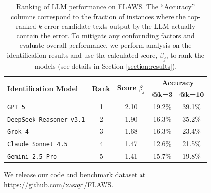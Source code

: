 \documentclass{article}
\newcommand{\gemini}{\texttt{Gemini 2.5 Pro}}
\newcommand{\gpt}{\texttt{GPT 5}}
\newcommand{\grok}{\texttt{Grok 4}}
\newcommand{\deepseek}{\texttt{DeepSeek Reasoner v3.1}}
\newcommand{\claude}{\texttt{Claude Sonnet 4.5}}
\newcommand{\benchmark}{FLAWS}
\begin{document}
\begin{itemize}
    \begin{table}[th!]
    \centering
    \begin{tabular}{|l|c|c|c|c|}
    \hline 
    \multirow{2}{*}{\textbf{Identification Model}} & \multirow{2}{*}{\textbf{Rank}} & \multirow{2}{*}{\textbf{Score $\beta_j$}} & \multicolumn{2}{c|}{\textbf{Accuracy}}\\
     &  & & \textbf{@k=3} & \textbf{@k=10}\\
    \hline
    \gpt{} & 1 & 2.10 & 19.2\% & 39.1\%\\
    \deepseek{} & 2 & 1.90 & 16.3\%& 35.2\%\\
    \grok{} & 3 & 1.68 & 16.3\% & 23.4\%\\
    \claude{} & 4 & 1.47 & 12.6\% & 21.5\%\\
    \gemini{} & 5 & 1.41 & 15.7\% & 19.8\%\\
    \hline
    \end{tabular}
    \caption{Ranking of LLM performance on \benchmark. The ``Accuracy'' columns correspond to the fraction of instances where the top-ranked $k$ error candidate texts output by the LLM actually contain the error. To mitigate any confounding factors and evaluate overall performance, we perform analysis on the identification results and use the calculated score, $\beta_j$, to rank the models (see details in Section \ref{section:results}).}
    \label{table:model_ranking}
\end{table}
\end{itemize}
We release our code and benchmark dataset at \url{https://github.com/xasayi/FLAWS}.
\end{document}
